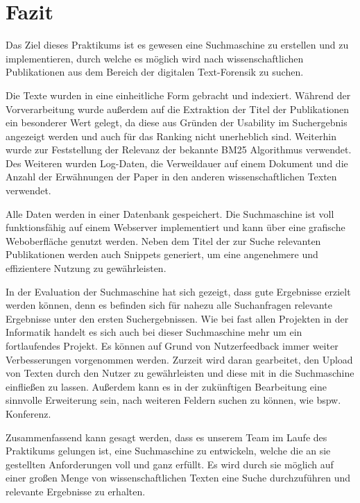 
\section{Fazit}

Das Ziel dieses Praktikums ist es gewesen eine Suchmaschine zu
erstellen und zu implementieren, durch welche es möglich wird nach
wissenschaftlichen Publikationen aus dem Bereich der digitalen
Text-Forensik zu suchen.

Die Texte wurden in eine einheitliche Form gebracht und
indexiert. Während der Vorverarbeitung wurde außerdem auf die
Extraktion der Titel der Publikationen ein besonderer Wert gelegt, da
diese aus Gründen der Usability im Suchergebnis angezeigt werden und 
auch für das Ranking nicht unerheblich sind. Weiterhin wurde zur
Feststellung der Relevanz der bekannte BM25 Algorithmus
verwendet. Des Weiteren wurden Log-Daten, die Verweildauer auf einem
Dokument und die Anzahl der Erwähnungen der Paper in den anderen
wissenschaftlichen Texten verwendet.

Alle Daten werden in einer Datenbank gespeichert. Die Suchmaschine ist
voll funktionsfähig auf einem Webserver implementiert und kann über
eine grafische Weboberfläche genutzt werden. Neben dem Titel der zur
Suche relevanten Publikationen werden auch Snippets generiert, um eine
angenehmere und effizientere Nutzung zu gewährleisten.

In der Evaluation der Suchmaschine hat sich gezeigt, dass gute
Ergebnisse erzielt werden können, denn es befinden sich für nahezu
alle Suchanfragen relevante Ergebnisse unter den ersten
Suchergebnissen.  Wie bei fast allen Projekten in der Informatik
handelt es sich auch bei dieser Suchmaschine mehr um ein fortlaufendes
Projekt. Es können auf Grund von Nutzerfeedback immer weiter
Verbesserungen vorgenommen werden. Zurzeit wird daran gearbeitet, den
Upload von Texten durch den Nutzer zu gewährleisten und diese mit in
die Suchmaschine einfließen zu lassen. 
Außerdem kann es in der zukünftigen Bearbeitung eine sinnvolle
Erweiterung sein, nach weiteren Feldern suchen zu können, wie bspw.
Konferenz.

Zusammenfassend kann gesagt werden, dass es unserem Team im Laufe des
Praktikums gelungen ist, eine Suchmaschine zu entwickeln, welche die
an sie gestellten Anforderungen voll und ganz erfüllt. Es wird durch
sie möglich auf einer großen Menge von wissenschaftlichen Texten eine
Suche durchzuführen und relevante Ergebnisse zu erhalten.

